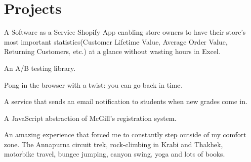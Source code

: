 \documentclass[letterpaper]{deedy-resume} %
\begin{document}
\sectionspace %


\section{Projects}


A Software as a Service Shopify App enabling store owners to have
their store's most important statistics(Customer Lifetime Value,
Average Order Value, Returning Customers, etc.) at a glance without
wasting hours in Excel.
\sectionspace


An A/B testing library.
\sectionspace


Pong in the browser with a twist: you can go back in time.
\sectionspace


A service that sends an email notification to students when new grades
come in.
\sectionspace


A JavaScript abstraction of McGill's registration system.

\sectionspace


An amazing experience that forced me to constantly step outside of my
comfort zone.
The Annapurna circuit trek, rock-climbing in Krabi and Thakhek,
motorbike travel, bungee jumping, canyon swing, yoga and lots
of books.
\end{document}
